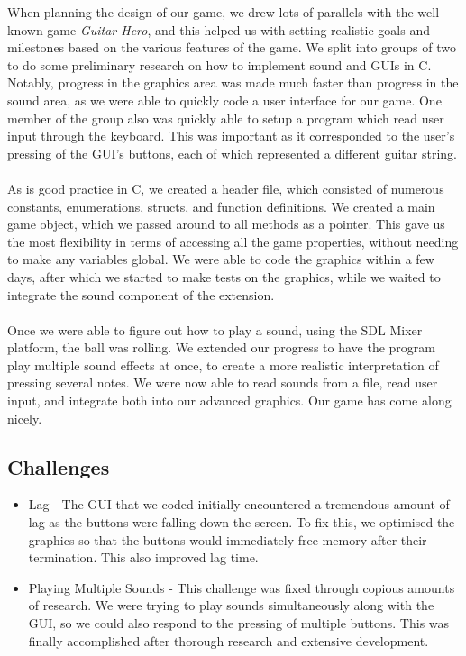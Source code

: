 \documentclass[11pt]{article}
\begin{document}
When planning the design of our game, we drew lots of parallels with the well-known game \emph{Guitar Hero}, and this helped us with setting realistic goals and milestones based on the various features of the game. We split into groups of two to do some preliminary research on how to implement sound and GUIs in C. Notably, progress in the graphics area was made much faster than progress in the sound area, as we were able to quickly code a user interface for our game. One member of the group also was quickly able to setup a program which read user input through the keyboard. This was important as it corresponded to the user's pressing of the GUI's buttons, each of which represented a different guitar string.
\\ \\ \hspace{10mm} As is good practice in C, we created a header file, which consisted of numerous constants, enumerations, structs, and function definitions. We created a main game object, which we passed around to all methods as a pointer. This gave us the most flexibility in terms of accessing all the game properties, without needing to make any variables global. We were able to code the graphics within a few days, after which we started to make tests on the graphics, while we waited to integrate the sound component of the extension.
\\ \\ \hspace{10mm} Once we were able to figure out how to play a sound, using the SDL Mixer platform, the ball was rolling. We extended our progress to have the program play multiple sound effects at once, to create a more realistic interpretation of pressing several notes. We were now able to read sounds from a file, read user input, and integrate both into our advanced graphics. Our game has come along nicely.

\subsection{Challenges}

\begin{itemize}

\item Lag - The GUI that we coded initially encountered a tremendous amount of lag as the buttons were falling down the screen. To fix this, we optimised the graphics so that the buttons would immediately free memory after their termination. This also improved lag time.

\item Playing Multiple Sounds - This challenge was fixed through copious amounts of research. We were trying to play sounds simultaneously along with the GUI, so we could also respond to the pressing of multiple buttons. This was finally accomplished after thorough research and extensive development.

\end{itemize}
\end{document}
